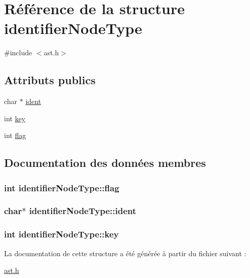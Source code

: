 \hypertarget{structidentifierNodeType}{\section{Référence de la structure identifier\-Node\-Type}
\label{structidentifierNodeType}
}


{\ttfamily \#include $<$ast.\-h$>$}

\subsection*{Attributs publics}
\begin{DoxyCompactItemize}
\item 
char $\ast$ \hyperlink{structidentifierNodeType_a809e997f6bede0a31d4eeac0b69847d2}{ident}
\item 
int \hyperlink{structidentifierNodeType_af46293c8242bffa382258675b7401572}{key}
\item 
int \hyperlink{structidentifierNodeType_a03c64619a65bc943db71d81a69054332}{flag}
\end{DoxyCompactItemize}


\subsection{Documentation des données membres}
\hypertarget{structidentifierNodeType_a03c64619a65bc943db71d81a69054332}{
\subsubsection[{flag}]{\setlength{\rightskip}{0pt plus 5cm}int identifier\-Node\-Type\-::flag}}\label{structidentifierNodeType_a03c64619a65bc943db71d81a69054332}
\hypertarget{structidentifierNodeType_a809e997f6bede0a31d4eeac0b69847d2}{
\subsubsection[{ident}]{\setlength{\rightskip}{0pt plus 5cm}char$\ast$ identifier\-Node\-Type\-::ident}}\label{structidentifierNodeType_a809e997f6bede0a31d4eeac0b69847d2}
\hypertarget{structidentifierNodeType_af46293c8242bffa382258675b7401572}{
\subsubsection[{key}]{\setlength{\rightskip}{0pt plus 5cm}int identifier\-Node\-Type\-::key}}\label{structidentifierNodeType_af46293c8242bffa382258675b7401572}


La documentation de cette structure a été générée à partir du fichier suivant \-:\begin{DoxyCompactItemize}
\item 
\hyperlink{ast_8h}{ast.\-h}\end{DoxyCompactItemize}
